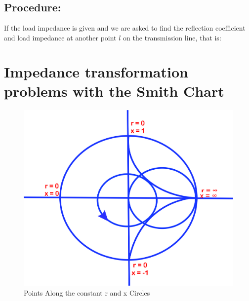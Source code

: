 \begin{enumerate}[(i)]
\subsection*{Procedure:}
\end{enumerate}


If the load impedance is given and we are asked to find the reflection coefficient and load impedance at another point $l$ on the transmission line, that is:

\section{Impedance transformation problems with the Smith Chart}
\begin{figure}[h]
\centering
\includegraphics[width=0.5\linewidth]{./graphics/uytrewsxcvbj}
\caption{Points Along the constant r and x Circles}
\label{fig:uytrewsxcvbj}
\end{figure}

